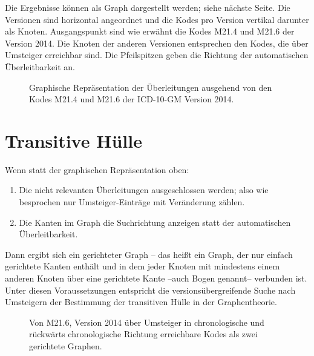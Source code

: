Die Ergebnisse können als Graph dargestellt werden; siehe nächste Seite. Die Versionen sind horizontal angeordnet und die Kodes pro Version vertikal darunter als Knoten. Ausgangspunkt sind wie erwähnt die Kodes M21.4 und M21.6 der Version 2014. Die Knoten der anderen Versionen entsprechen den Kodes, die über Umsteiger erreichbar sind. Die Pfeilspitzen geben die Richtung der automatischen Überleitbarkeit an. 

\begin{figure}[H]
    \centering\Large%
    \resizebox{.99\linewidth}{!}{}
    \normalsize\caption{Graphische Repräsentation der Überleitungen ausgehend von den Kodes M21.4 und M21.6 der ICD-10-GM Version 2014.}
\end{figure}

\section{Transitive Hülle}

Wenn statt der graphischen Repräsentation oben:

\begin{enumerate}
\item Die nicht relevanten Überleitungen ausgeschlossen werden; also wie besprochen nur Umsteiger-Einträge mit Veränderung zählen.
\item Die Kanten im Graph die Suchrichtung anzeigen statt der automatischen Überleitbarkeit.
\end{enumerate}

Dann ergibt sich ein gerichteter Graph -- das heißt ein Graph, der nur einfach gerichtete Kanten enthält und in dem jeder Knoten mit mindestens einem anderen Knoten über eine gerichtete Kante --auch Bogen genannt-- verbunden ist. Unter diesen Voraussetzungen entspricht die versionsübergreifende Suche nach Umsteigern der Bestimmung der transitiven Hülle in der Graphentheorie. 

\begin{figure}[H]
    \centering\Large%
    \resizebox{.99\linewidth}{!}{}
    \normalsize\caption{Von M21.6, Version 2014 über Umsteiger in chronologische und rückwärts chronologische Richtung erreichbare Kodes als zwei gerichtete Graphen.}
    \label{img-m21-6}
\end{figure}

